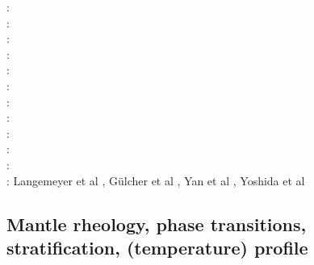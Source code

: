 \begin{scriptsize}
\twothousandnine: \cite{wodd09}\cite{fobe09}\cite{gows09}\cite{deta09}\cite{onlj09}\cite{wazh09}\cite{vavv09}
      \cite{brha09}\cite{scbs09b}\cite{oebm09}\cite{fuog09}\\
\twothousandten: \cite{bumb10}\cite{detn10}\cite{yayh10}\cite{nata10}\cite{hole10}\cite{zhzl10}\cite{vayb10}
      \cite{brmw10}\\
\twothousandeleven: \cite{lowm11}\cite{rota11}\cite{woda11}\cite{lemj11}\cite{befa11}\cite{pewb11}\\
\twothousandtwelve: \cite{bisa12}\cite{cort12b}\cite{deyt12}\cite{solo12}\cite{wele12}\\
\twothousandthirteen: \cite{holj13}\cite{dadb13}\cite{toyd13}\cite{bogs13a}\cite{busa13}\cite{mika13}
      \cite{fabc13}\cite{cosr13}\cite{coml13}\cite{cost13}\cite{stha13}\cite{plth13}\cite{oflb13}\\
\twothousandfourteen: \cite{arfw14}\cite{helo14}\cite{crta14}\cite{flgw14}\cite{roct14}\cite{cort14}\cite{becr14}
      \cite{nata14}\cite{stha14}\cite{stlh14}\cite{ogaw14}\\
\twothousandfifteen: \cite{thkp15}\cite{wegg15}\cite{bect15}\cite{pesw15}\\
\twothousandsixteen: \cite{frbs16}\cite{sisc16}\cite{boba16}\cite{wele16}\cite{welm16}\cite{vade16}\cite{chah16}\\
\twothousandseventeen: \cite{ghts17}\cite{civj17}\\
\twothousandeighteen: \cite{cold18}\cite{arcf18}\cite{cosh18}\cite{wele18}\\
\twothousandnineteen: \cite{gult19}\cite{mazh19}\cite{cohf19}\cite{lewh19}\cite{ulcw19}\cite{boba19}\cite{fube19}
      \cite{plju19}\\
\twothousandtwenty: Langemeyer et al \cite{lalt20}, G\"ulcher et al \cite{gugb20}, Yan et al \cite{yabt20}, Yoshida et al \cite{yosy20}
\end{scriptsize}

\subsection{Mantle rheology, phase transitions, stratification, (temperature) profile}

